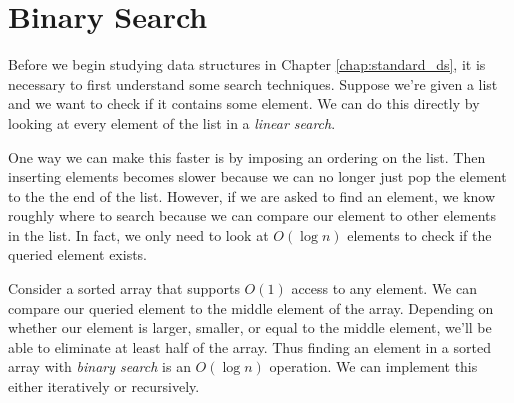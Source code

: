 \section{Binary Search}

Before we begin studying data structures in Chapter \ref{chap:standard_ds}, it is necessary to first understand some search techniques. Suppose we're given a list and we want to check if it contains some element. We can do this directly by looking at every element of the list in a \emph{linear search}.

One way we can make this faster is by imposing an ordering on the list. Then inserting elements becomes slower because we can no longer just pop the element to the the end of the list. However, if we are asked to find an element, we know roughly where to search because we can compare our element to other elements in the list. In fact, we only need to look at $O(\log n)$ elements to check if the queried element exists.

Consider a sorted array that supports $O(1)$ access to any element. We can compare our queried element to the middle element of the array. Depending on whether our element is larger, smaller, or equal to the middle element, we'll be able to eliminate at least half of the array. Thus finding an element in a sorted array with \emph{binary search} is an $O(\log{n})$ operation. We can implement this either iteratively or recursively.

